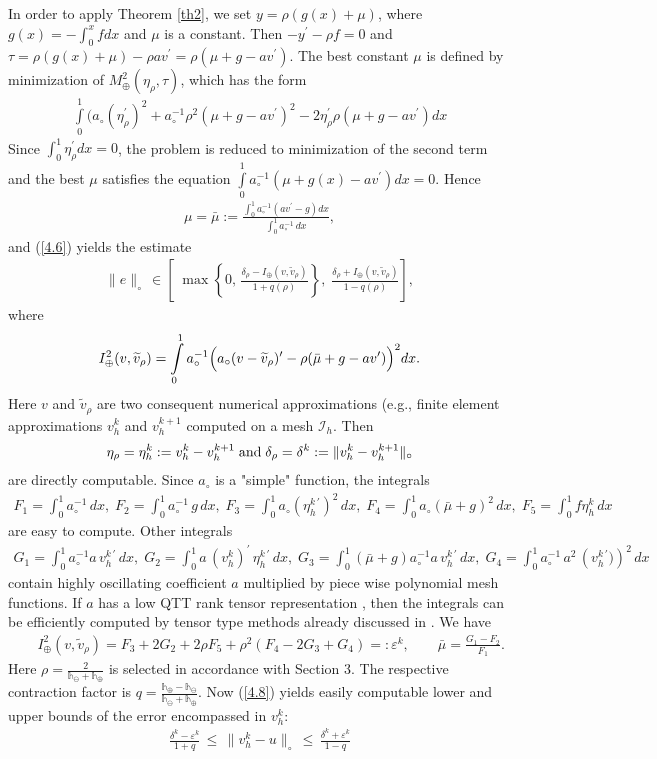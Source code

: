 \documentclass[amstex,amstext,amsfonts,epsf,12pt] {amsart}
\newcommand\be{\begin{eqnarray*}}
\newcommand\ee{\end{eqnarray*}}
\newcommand\ben{\begin{eqnarray}}
\newcommand\een{\end{eqnarray}}
\def\be{\begin{eqnarray*}}
\def\ee{\end{eqnarray*}}
\def\ben{\begin{eqnarray}}
\def\een{\end{eqnarray}}
\def\wt{\widetilde}
\begin{document}
In order to apply Theorem \ref{th2},
we set $y=\rho(g(x)+\mu)$, where $g(x)=-\int^x_0fdx$ and $\mu$ is a constant. Then $-y^\prime-\rho f=0$
and $\tau=\rho(g(x)+\mu)-\rho a v^\prime=\rho(\mu+g-a v^\prime)$. The
best constant $\mu$ is defined by minimization of $M^2_\oplus(\eta_\rho,\tau)$, which has the form 
\be
 \int\limits^1_0 (a_\circ(\eta^\prime_\rho)^2+
a_\circ^{-1}\rho^2(\mu+g-a v^\prime)^2-2\eta^\prime_\rho\rho(\mu+g-a v^\prime) dx
\ee
 Since $\int^1_0 \eta^\prime_\rho dx=0$,
%
the problem is reduced to
 minimization of the second term
and the best
 $\mu$ satisfies the equation
$
\int\limits^1_0 a^{-1}_\circ
(\mu+g(x)-a v^\prime)dx=0.
$
Hence
\be
\mu=\bar\mu:=\frac{\int^1_0 a^{-1}_\circ(a v^\prime-g)dx}{
\int^1_0 a^{-1}_\circ\,dx},
\ee
and (\ref{4.6}) yields the estimate
\ben
\label{4.8}
\|e\|_\circ\,\in
\left[\;\max\left\{0,\,\frac{\delta_\rho-I_\oplus(v,\wt v_\rho)}{1+q(\rho)}\right\},\;\frac{\delta_\rho+
I_\oplus(v, \wt v_\rho)}{1-q(\rho)}
\right],
\een
where
\be
I^2_\oplus(v, \wt v_\rho)=
\int\limits^1_0 a^{-1}_\circ\Bigl(a_\circ(v-\wt v_\rho)^\prime-
\rho(\bar\mu+g-a v^\prime)\Bigr)^2 dx.
\ee
Here $v$ and $\wt v_\rho$ are two consequent numerical approximations (e.g., finite
element approximations $v^k_h$ and $v^{k+1}_h$ computed
on a mesh ${\mathcal I}_h$.
Then 
\be
\eta_\rho=\eta^k_h:=v^k_h-v^{k+1}_h\;{\rm and}\; \delta_\rho=\delta^k:=\|v^k_h-v^{k+1}_h\|_\circ
\ee
 are directly computable.
 Since $a_\circ$ is a "simple" function, the integrals 
\be
 F_1=\int^1_0\!\!\! a^{-1}_\circ\,dx,\; F_2= \int^1_0\!\!\! a^{-1}_\circ\, g\,dx,\; F_3= \int^1_0\!\!\! a_\circ\left(\eta^{k\,\prime}_h\right)^2\,dx,\;
 F_4= \int^1_0\!\!\! a_\circ\left(\bar\mu+g\right)^2\,dx,\;
 F_5=\int^1_0\!\!\!f\eta^k_h\,dx
\ee
 are easy to compute. Other integrals
\be
 G_1=\int^1_0\!\!\! a^{-1}_\circ a\, v^{k\,\prime}_h\,dx,\;
 G_2=\int^1_0\!\!\! a \,(v^k_h)^\prime\,\eta^{k\,\prime}_h \,dx,\;
 G_3=\int^1_0\!\!\!(\bar\mu+g) a^{-1}_\circ a \,v^{k\,\prime}_h\,dx,\;
 G_4=\int^1_0\!\!\! a^{-1}_\circ \,a^2\,\left(v^{k\,\prime}_h)\right)^2\,dx
\ee
contain highly oscillating coefficient $a$ multiplied by  piece wise polynomial mesh functions.
If $a$ has a low QTT rank tensor representation \cite{KhQuant:09}, then the  integrals can be 
efficiently computed by tensor type methods already discussed in \cite{BokhSRep:15}. 
We have
\be
&&I^2_\oplus(v,\wt v_\rho)= F_3+2 G_2+2\rho F_5
+\rho^2( F_4-2 G_3 + G_4)=:\varepsilon^k,\qquad
\bar \mu=\frac{ G_1- F_2}{ F_1}.
\ee
Here
$\rho=\frac{2}{{\mathds h}_\ominus+{\mathds h}_\oplus}$ is selected in accordance 
with  Section 3. The
respective contraction factor is $q=\frac{{\mathds h}_\oplus-{\mathds h}_\ominus}
 { {\mathds h}_\ominus+{\mathds h}_\oplus}$.
Now (\ref{4.8}) yields easily computable lower and upper bounds of the error
encompassed in $v^k_h$:
\be
\label{4.9}
\frac{\delta^k-\varepsilon^k}{1+q}\,\leq\,\|v^k_h-u\|_\circ\,\leq\, \frac{\delta^k+\varepsilon^k}{1-q}
\ee
\end{document}
